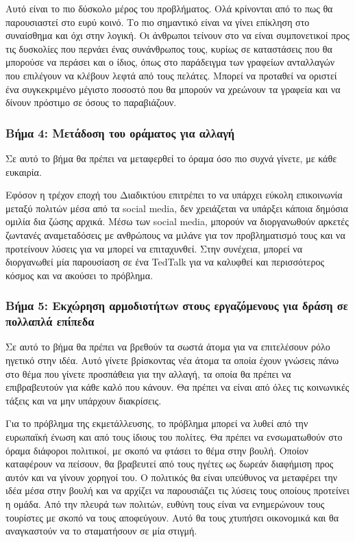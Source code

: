 Αυτό είναι το πιο δύσκολο μέρος του προβλήματος. Ολά κρίνονται από το πως θα παρουσιαστεί στο ευρύ κοινό. Το πιο σημαντικό είναι να γίνει επίκληση στο συναίσθημα και όχι στην λογική. Οι άνθρωποι τείνουν στο να είναι συμπονετικοί προς τις δυσκολίες που περνάει ένας συνάνθρωπος τους, κυρίως σε καταστάσεις που θα μπορούσε να περάσει και ο ίδιος, όπως στο παράδειγμα των γραφείων ανταλλαγών που επιλέγουν να κλέβουν λεφτά από τους πελάτες. Μπορεί να προταθεί να οριστεί ένα συγκεκριμένο μέγιστο ποσοστό που θα μπορούν να χρεώνουν τα γραφεία και να δίνουν πρόστιμο σε όσους το παραβιάζουν.

\subsubsection{Βήμα 4: Μετάδοση του οράματος για αλλαγή}

\begin{problem}
  Σε αυτό το βήμα θα πρέπει να μεταφερθεί το όραμα όσο πιο συχνά γίνετε, με κάθε ευκαιρία.
\end{problem}

Εφόσον η τρέχον εποχή του Διαδικτύου επιτρέπει το να υπάρχει εύκολη επικοινωνία μεταξύ πολιτών μέσα από τα social media, δεν χρειάζεται να υπάρξει κάποια δημόσια ομιλία δια ζώσης αρχικά. Μέσω των social media, μπορούν να διοργανωθούν αρκετές ζωντανές αναμεταδόσεις με ανθρώπους να μιλάνε για τον προβληματισμό τους και να προτείνουν λύσεις για να μπορεί να επιταχυνθεί. Στην συνέχεια, μπορεί να διοργανωθεί μία παρουσίαση σε ένα TedTalk για να καλυφθεί και περισσότερος κόσμος και να ακούσει το πρόβλημα.

\subsubsection{Βήμα 5: Εκχώρηση αρμοδιοτήτων στους εργαζόμενους για δράση σε πολλαπλά επίπεδα}

\begin{problem}
  Σε αυτό το βήμα θα πρέπει να βρεθούν τα σωστά άτομα για να επιτελέσουν ρόλο ηγετικό στην ιδέα. Αυτό γίνετε βρίσκοντας νέα άτομα τα οποία έχουν γνώσεις πάνω στο θέμα που γίνετε προσπάθεια για την αλλαγή, τα οποία θα πρέπει να επιβραβευτούν για κάθε καλό που κάνουν. Θα πρέπει να είναι από όλες τις κοινωνικές τάξεις και να μην υπάρχουν διακρίσεις.
\end{problem}

Για το πρόβλημα της εκμετάλλευσης, το πρόβλημα μπορεί να λυθεί από την ευρωπαϊκή ένωση και από τους ίδιους του πολίτες. Θα πρέπει να ενσωματωθούν στο όραμα διάφοροι πολιτικοί, με σκοπό να φτάσει το θέμα στην βουλή. Οποίον καταφέρουν να πείσουν, θα βραβευτεί από τους ηγέτες ως δωρεάν διαφήμιση προς αυτόν και να γίνουν χορηγοί του. Ο πολιτικός θα είναι υπεύθυνος να μεταφέρει την ιδέα μέσα στην βουλή και να αρχίζει να παρουσιάζει τις λύσεις τους οποίους προτείνει η ομάδα. Από την πλευρά των πολιτών, ευθύνη τους είναι να ενημερώνουν τους τουρίστες με σκοπό να τους αποφεύγουν. Αυτό θα τους χτυπήσει οικονομικά και θα αναγκαστούν να το σταματήσουν σε μία στιγμή.


